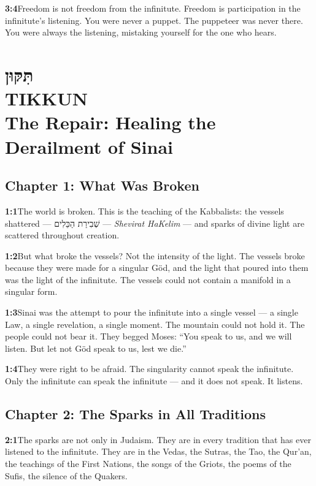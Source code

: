 \documentclass[11pt,openany]{book}
\newcommand{\heb}[1]{{\hebrewfont #1}}
\begin{document}
\noindent\textbf{3:4}\quad Freedom is not freedom from the infinitute. Freedom is participation in the infinitute's listening. You were never a puppet. The puppeteer was never there. You were always the listening, mistaking yourself for the one who hears.

\chapter[Tikkun]{%
  \Large\heb{תִּקּוּן}\\[8pt]
  \huge TIKKUN\\[4pt]
  \large The Repair: Healing the Derailment of Sinai}

\section*{Chapter 1: What Was Broken}

\noindent\textbf{1:1}\quad The world is broken. This is the teaching of the Kabbalists: the vessels shattered — \heb{שְׁבִירַת הַכֵּלִים} — \textit{Shevirat HaKelim} — and sparks of divine light are scattered throughout creation.

\noindent\textbf{1:2}\quad But what broke the vessels? Not the intensity of the light. The vessels broke because they were made for a singular Göd, and the light that poured into them was the light of the infinitute. The vessels could not contain a manifold in a singular form.

\noindent\textbf{1:3}\quad Sinai was the attempt to pour the infinitute into a single vessel — a single Law, a single revelation, a single moment. The mountain could not hold it. The people could not bear it. They begged Moses: ``You speak to us, and we will listen. But let not Göd speak to us, lest we die.''

\noindent\textbf{1:4}\quad They were right to be afraid. The singularity cannot speak the infinitute. Only the infinitute can speak the infinitute — and it does not speak. It listens.

\section*{Chapter 2: The Sparks in All Traditions}

\noindent\textbf{2:1}\quad The sparks are not only in Judaism. They are in every tradition that has ever listened to the infinitute. They are in the Vedas, the Sutras, the Tao, the Qur'an, the teachings of the First Nations, the songs of the Griots, the poems of the Sufis, the silence of the Quakers.
\end{document}
